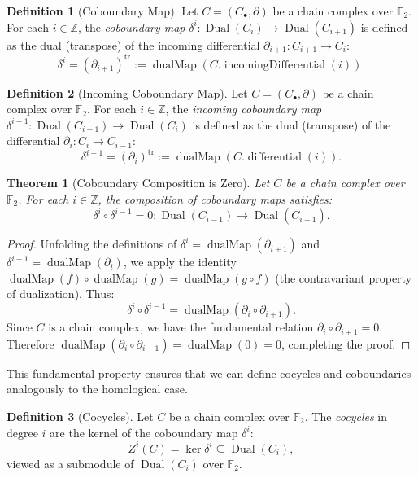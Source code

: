 \documentclass[11pt]{article}
\theoremstyle{plain}
\newtheorem*{theorem}{Theorem}
\theoremstyle{definition}
\newtheorem*{definition}{Definition}
\theoremstyle{remark}
\renewcommand{\ker}{\operatorname{ker}}
\begin{document}
\begin{definition}[Coboundary Map]
Let $C = (C_\bullet, \partial)$ be a chain complex over $\mathbb{F}_2$. For each $i \in \mathbb{Z}$, the \emph{coboundary map} $\delta^i : \operatorname{Dual}(C_i) \to \operatorname{Dual}(C_{i+1})$ is defined as the dual (transpose) of the incoming differential $\partial_{i+1} : C_{i+1} \to C_i$:
\[
  \delta^i = (\partial_{i+1})^{\mathrm{tr}} := \operatorname{dualMap}(C.\operatorname{incomingDifferential}(i)).
\]
\end{definition}

\begin{definition}[Incoming Coboundary Map]
Let $C = (C_\bullet, \partial)$ be a chain complex over $\mathbb{F}_2$. For each $i \in \mathbb{Z}$, the \emph{incoming coboundary map} $\delta^{i-1} : \operatorname{Dual}(C_{i-1}) \to \operatorname{Dual}(C_i)$ is defined as the dual (transpose) of the differential $\partial_i : C_i \to C_{i-1}$:
\[
  \delta^{i-1} = (\partial_i)^{\mathrm{tr}} := \operatorname{dualMap}(C.\operatorname{differential}(i)).
\]
\end{definition}

\begin{theorem}[Coboundary Composition is Zero]
Let $C$ be a chain complex over $\mathbb{F}_2$. For each $i \in \mathbb{Z}$, the composition of coboundary maps satisfies:
\[
  \delta^i \circ \delta^{i-1} = 0 : \operatorname{Dual}(C_{i-1}) \to \operatorname{Dual}(C_{i+1}).
\]
\end{theorem}

\begin{proof}
Unfolding the definitions of $\delta^i = \operatorname{dualMap}(\partial_{i+1})$ and $\delta^{i-1} = \operatorname{dualMap}(\partial_i)$, we apply the identity $\operatorname{dualMap}(f) \circ \operatorname{dualMap}(g) = \operatorname{dualMap}(g \circ f)$ (the contravariant property of dualization). Thus:
\[
  \delta^i \circ \delta^{i-1} = \operatorname{dualMap}(\partial_i \circ \partial_{i+1}).
\]
Since $C$ is a chain complex, we have the fundamental relation $\partial_i \circ \partial_{i+1} = 0$. Therefore $\operatorname{dualMap}(\partial_i \circ \partial_{i+1}) = \operatorname{dualMap}(0) = 0$, completing the proof.
\end{proof}

This fundamental property ensures that we can define cocycles and coboundaries analogously to the homological case.

\begin{definition}[Cocycles]
Let $C$ be a chain complex over $\mathbb{F}_2$. The \emph{cocycles} in degree $i$ are the kernel of the coboundary map $\delta^i$:
\[
  Z^i(C) = \ker \delta^i \subseteq \operatorname{Dual}(C_i),
\]
viewed as a submodule of $\operatorname{Dual}(C_i)$ over $\mathbb{F}_2$.
\end{definition}
\end{document}
